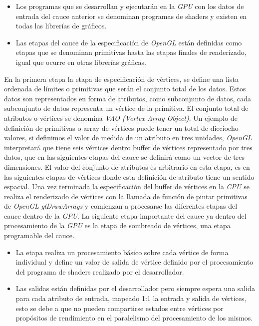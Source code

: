 \documentclass[a4paper]{book}
\begin{document}
\begin{itemize}
  \item Los programas que se desarrollan y ejecutarán en la \textit{GPU} con los datos de entrada del cauce anterior se denominan programas
  de shaders y existen en todas las librerías de gráficos.

  \item Las etapas del cauce de la especificación de \textit{OpenGL} están definidas como etapas que se denominan primitivas hasta las etapas
  finales de renderizado, igual que ocurre en otras librerías gráficas.
\end{itemize}

En la primera etapa la etapa de especificación de vértices, se define una lista ordenada de límites o primitivas que serán el conjunto
total de los datos. Estos datos son representados en forma de atributos, como subconjunto de datos, cada subconjunto de datos
representa un vértice de la primitiva. El conjunto total de atributos o vértices se denomina \textit{VAO (Vertex Array Object)}.
Un ejemplo de definición de primitivas o array de vértices puede tener un total de dieciocho valores, si definimos el valor de medida
de un atributo en tres unidades, \textit{OpenGL} interpretará que tiene seis vértices dentro buffer de vértices representado por tres
datos, que en las siguientes etapas del cauce se definirá como un vector de tres dimensiones. El valor del conjunto de atributos es
arbitrario en esta etapa, es en las siguientes etapas de vértices donde esta definición de atributo tiene un sentido espacial. Una vez
terminada la especificación del buffer de vértices en la \textit{CPU} se realiza el renderizado de vértices con la llamada de función
de pintar primitivas de \textit{OpenGL} \textit{glDrawArrays} y comienzan a procesarse las diferentes etapas del cauce dentro de
la \textit{GPU}. La siguiente etapa importante del cauce ya dentro del procesamiento de la \textit{GPU} es la etapa de sombreado
de vértices, una etapa programable del cauce.

\begin{itemize}
  \item La etapa realiza un procesamiento básico sobre cada vértice de forma individual y define un valor de salida de vértice
  definido por el procesamiento del programa de shaders realizado por el desarrollador.

  \item Las salidas están definidas por el desarrollador pero siempre espera una salida para cada atributo de entrada, mapeado 1:1
  la entrada y salida de vértices, esto se debe a que no pueden compartirse estados entre vértices por propósitos de rendimiento
  en el paralelismo del procesamiento de los mismos.
\end{itemize}
\end{document}
